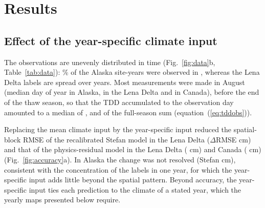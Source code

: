 \section{Results}\label{sec:results}

\subsection{Effect of the year-specific climate input}
The observations are unevenly distributed in time (Fig.~\ref{fig:data}b, Table~\ref{tab:data}): \ntopyrshareAk\% of the Alaska site-years were observed in \ntopyrAk, whereas the Lena Delta labels are spread over \nnyrLe{} years. Most measurements were made in August (median day of year \ndoymedAk{} in Alaska, \ndoymedLe{} in the Lena Delta and \ndoymedCa{} in Canada), before the end of the thaw season, so that the TDD accumulated to the observation day amounted to a median of \ntddfracAk, \ntddfracLe{} and \ntddfracCa{} of the full-season sum (equation~(\ref{eq:tddobs})).

Replacing the mean climate input by the year-specific input reduced the spatial-block RMSE of the recalibrated Stefan model in the Lena Delta ($\Delta$RMSE \ndforcLePo{} cm) and that of the physics-residual model in the Lena Delta (\ndforcLeRo{} cm) and Canada (\ndforcCaRo{} cm) (Fig.~\ref{fig:accuracy}a). In Alaska the change was not resolved (Stefan \ndforcAkPo{} cm), consistent with the concentration of the labels in one year, for which the year-specific input adds little beyond the spatial pattern. Beyond accuracy, the year-specific input ties each prediction to the climate of a stated year, which the yearly maps presented below require.


